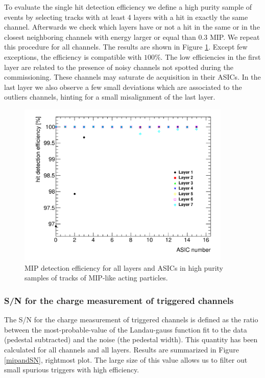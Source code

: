 \documentclass[a4paper,11pt]{article}
\begin{document}
To evaluate 
the single hit detection efficiency we define a high purity sample of
events by selecting
tracks with at least 4 layers with a hit in exactly the same channel. Afterwards we 
check which layers have or not a hit in the same or in the closest neighboring channels with energy larger or equal than 0.3 MIP.
We repeat this procedure for all channels.
The results are shown in Figure \ref{efficiency}. Except few exceptions, the efficiency is 
compatible with $100\%$.
The low efficiencies in the first layer are related to the presence of
noisy channels not spotted during the commissioning. These channels
may saturate de acquisition in their ASICs. In the last layer we also observe a few small deviations
which are associated to the outliers channels, hinting for a small misalignment of the last layer.

\begin{figure}[!t]
  \centering 
  \includegraphics[width=4in]{efficiency_nhits4_chips-eps-converted-to.pdf}
  \caption{MIP detection efficiency for all layers and ASICs in high purity samples of tracks of MIP-like acting particles.}
\label{efficiency}
\end{figure}


\subsubsection{S/N for the charge measurement of triggered channels}
\label{sec:sn}

The S/N for the charge measurement of triggered channels is defined 
as the ratio between the most-probable-value of
the Landau-gauss function fit to the data (pedestal subtracted) and the noise (the pedestal width). This quantity 
has been calculated for all channels and all layers. 
Results are summarized in Figure \ref{mipandSN}, rightmost plot.
The large size of this value allows us to filter out small spurious triggers 
with high efficiency.
\end{document}
